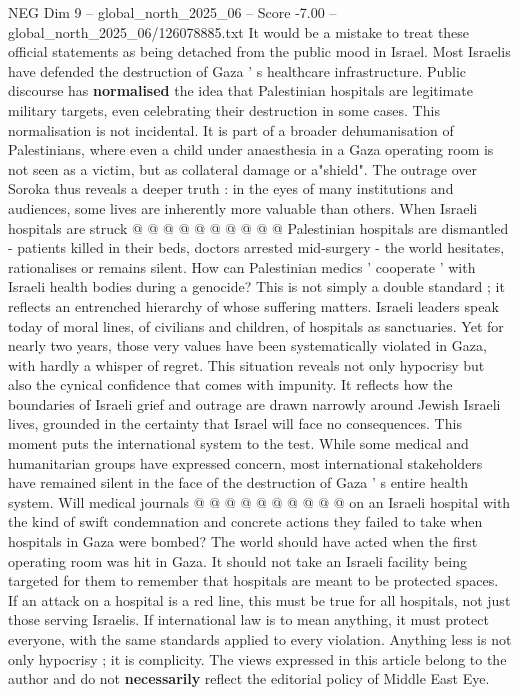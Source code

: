 \begin{textsample}{NEG Dim 9 – global\_north\_2025\_06 – Score -7.00 – global\_north\_2025\_06/126078885.txt}
It would be a mistake to treat these official statements as being detached from the public mood in Israel.
Most Israelis have defended the destruction of Gaza ' s healthcare infrastructure.
Public discourse has \textbf{normalised} the idea that Palestinian hospitals are legitimate military targets, even celebrating their destruction in some cases.
This normalisation is not incidental.
It is part of a broader dehumanisation of Palestinians, where even a child under anaesthesia in a Gaza operating room is not seen as a victim, but as collateral damage or a"shield".
The outrage over Soroka thus reveals a deeper truth : in the eyes of many institutions and audiences, some lives are inherently more valuable than others.
When Israeli hospitals are struck @ @ @ @ @ @ @ @ @ @ Palestinian hospitals are dismantled - patients killed in their beds, doctors arrested mid-surgery - the world hesitates, rationalises or remains silent.
How can Palestinian medics ' cooperate ' with Israeli health bodies during a genocide?
This is not simply a double standard ; it reflects an entrenched hierarchy of whose suffering matters.
Israeli leaders speak today of moral lines, of civilians and children, of hospitals as sanctuaries.
Yet for nearly two years, those very values have been systematically violated in Gaza, with hardly a whisper of regret.
This situation reveals not only hypocrisy but also the cynical confidence that comes with impunity.
It reflects how the boundaries of Israeli grief and outrage are drawn narrowly around Jewish Israeli lives, grounded in the certainty that Israel will face no consequences.
This moment puts the international system to the test.
While some medical and humanitarian groups have expressed concern, most international stakeholders have remained silent in the face of the destruction of Gaza ' s entire health system.
Will medical journals @ @ @ @ @ @ @ @ @ @ on an Israeli hospital with the kind of swift condemnation and concrete actions they failed to take when hospitals in Gaza were bombed?
The world should have acted when the first operating room was hit in Gaza.
It should not take an Israeli facility being targeted for them to remember that hospitals are meant to be protected spaces.
If an attack on a hospital is a red line, this must be true for all hospitals, not just those serving Israelis.
If international law is to mean anything, it must protect everyone, with the same standards applied to every violation.
Anything less is not only hypocrisy ; it is complicity.
The views expressed in this article belong to the author and do not \textbf{necessarily} reflect the editorial policy of Middle East Eye.

\end{textsample}
